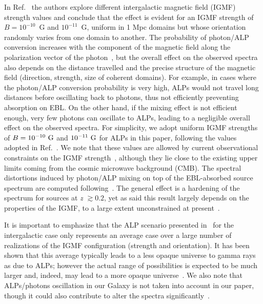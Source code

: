 \documentclass[final,5p]{elsarticle}
\begin{document}
In Ref.~\cite{MiguelALP} the authors explore different intergalactic magnetic field (IGMF) strength values and conclude that the effect is evident for an IGMF strength of $B=10^{-10}$~G and $10^{-11}$~G, uniform in 1 Mpc domains but whose orientation randomly varies from one domain to another. The probability of photon/ALP conversion increases with the component of the magnetic field along the polarization vector of the photon~\cite{Hooper2007PhRvL}, but the overall effect on the observed spectra also depends on the distance travelled and the precise structure of the magnetic field (direction, strength, size of coherent domains). For example, in cases where the photon/ALP conversion probability is very high, ALPs would not travel long distances before oscillating back to photons, thus not efficiently preventing absorption on EBL. On the other hand, if the mixing effect is not efficient enough, very few photons can oscillate to ALPs, leading to a negligible overall effect on the observed spectra. For simplicity, we adopt uniform IGMF strengths of $B=10^{-10}~{\rm G}$ and $10^{-11}~{\rm G}$ for ALPs in this paper, following the values adopted in Ref.~\cite{MiguelALP}. We note that these values are allowed by current observational constraints on the IGMF strength~\cite{NERONOV}, although they lie close to the existing upper limits coming from the cosmic microwave background (CMB). The spectral distortions induced by photon/ALP mixing on top of the EBL-absorbed source spectrum are computed following~\cite{MiguelALP}. The general effect is a hardening of the spectrum for sources at \textit{z} $\gtrsim0.2$, yet as said this result largely depends on the properties of the IGMF, to a large extent unconstrained at present~\cite{IGMF_1,IGMF_2,IGMF_3,IGMF_4,IGMF_5,IGMF_6,IGMF_7,Pshirkov2016PhRvL}. 

It is important to emphasize that the ALP scenario presented in~\cite{MiguelALP} for the intergalactic case only represents an average case over a large number of realizations of the IGMF configuration (strength and orientation). It has been shown that this average typically leads to a less opaque universe to gamma rays as due to ALPs; however the actual range of possibilities is expected to be much larger and, indeed, may lead to a more opaque universe~\cite{Mirizzi09}. We also note that ALPs/photons oscillation in our Galaxy is not taken into account in our paper, though it could also contribute to alter the spectra significantly~\cite{ALPGalactic1,ALPGalactic2,ALPGalactic3,ALPGalactic4}.
\end{document}
